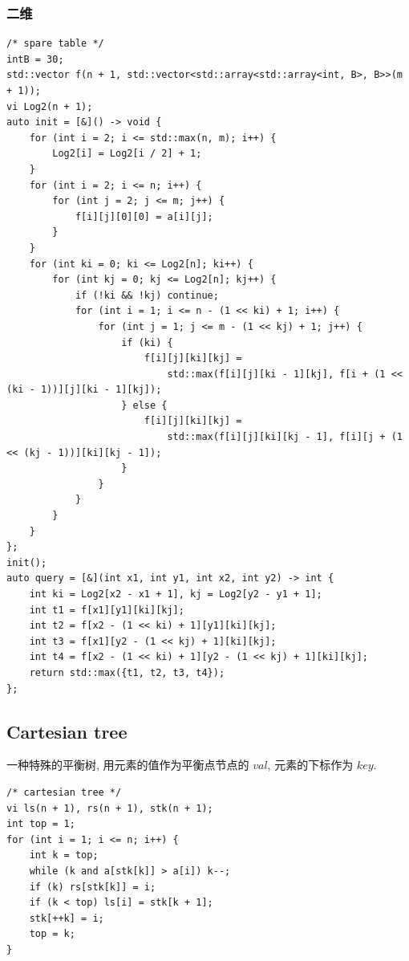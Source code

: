 \documentclass[UTF8, a4paper, titlepage, twoside]{ctexart}
\begin{document}
\subsubsection*{ 二维 }
\begin{lstlisting}[style=cpp]
/* spare table */
intB = 30;
std::vector f(n + 1, std::vector<std::array<std::array<int, B>, B>>(m + 1));
vi Log2(n + 1);
auto init = [&]() -> void {
    for (int i = 2; i <= std::max(n, m); i++) {
        Log2[i] = Log2[i / 2] + 1;
    }
    for (int i = 2; i <= n; i++) {
        for (int j = 2; j <= m; j++) {
            f[i][j][0][0] = a[i][j];
        }
    }
    for (int ki = 0; ki <= Log2[n]; ki++) {
        for (int kj = 0; kj <= Log2[n]; kj++) {
            if (!ki && !kj) continue;
            for (int i = 1; i <= n - (1 << ki) + 1; i++) {
                for (int j = 1; j <= m - (1 << kj) + 1; j++) {
                    if (ki) {
                        f[i][j][ki][kj] =
                            std::max(f[i][j][ki - 1][kj], f[i + (1 << (ki - 1))][j][ki - 1][kj]);
                    } else {
                        f[i][j][ki][kj] =
                            std::max(f[i][j][ki][kj - 1], f[i][j + (1 << (kj - 1))][ki][kj - 1]);
                    }
                }
            }
        }
    }
};
init();
auto query = [&](int x1, int y1, int x2, int y2) -> int {
    int ki = Log2[x2 - x1 + 1], kj = Log2[y2 - y1 + 1];
    int t1 = f[x1][y1][ki][kj];
    int t2 = f[x2 - (1 << ki) + 1][y1][ki][kj];
    int t3 = f[x1][y2 - (1 << kj) + 1][ki][kj];
    int t4 = f[x2 - (1 << ki) + 1][y2 - (1 << kj) + 1][ki][kj];
    return std::max({t1, t2, t3, t4});
};
\end{lstlisting}

\subsection{ Cartesian tree }
一种特殊的平衡树, 用元素的值作为平衡点节点的 $val$, 元素的下标作为 $key$.

\begin{lstlisting}[style=cpp]
/* cartesian tree */
vi ls(n + 1), rs(n + 1), stk(n + 1);
int top = 1;
for (int i = 1; i <= n; i++) {
    int k = top;
    while (k and a[stk[k]] > a[i]) k--;
    if (k) rs[stk[k]] = i;
    if (k < top) ls[i] = stk[k + 1];
    stk[++k] = i;
    top = k;
}
\end{lstlisting}
\end{document}

